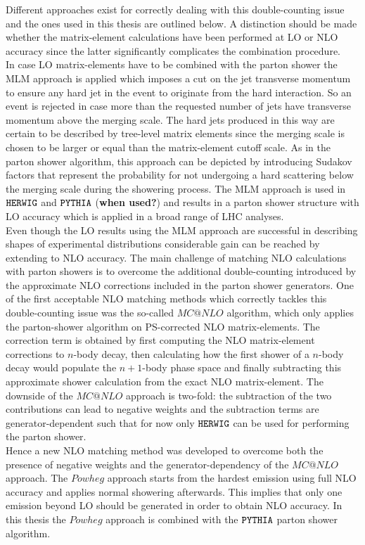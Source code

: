 Different approaches exist for correctly dealing with this double-counting issue and the ones used in this thesis are outlined below. A distinction should be made whether the matrix-element calculations have been performed at LO or NLO accuracy since the latter significantly complicates the combination procedure.\\
In case LO matrix-elements have to be combined with the parton shower the MLM approach is applied which imposes a cut on the jet transverse momentum to ensure any hard jet in the event to originate from the hard interaction. So an event is rejected in case more than the requested number of jets have transverse momentum above the merging scale. The hard jets produced in this way are certain to be described by tree-level matrix elements since the merging scale is chosen to be larger or equal than the matrix-element cutoff scale.
As in the parton shower algorithm, this approach can be depicted by introducing Sudakov factors that represent the probability for not undergoing a hard scattering below the merging scale during the showering process.
The MLM approach is used in $\texttt{HERWIG}$ and $\texttt{PYTHIA}$ (\textbf{when used?}) and results in a parton shower structure with LO accuracy which is applied in a broad range of LHC analyses.
\\
Even though the LO results using the MLM approach are successful in describing shapes of experimental distributions considerable gain can be reached by extending to NLO accuracy. 
The main challenge of matching NLO calculations with parton showers is to overcome the additional double-counting introduced by the approximate NLO corrections included in the parton shower generators. 
One of the first acceptable NLO matching methods which correctly tackles this double-counting issue was the so-called $MC@NLO$ algorithm, which only applies the parton-shower algorithm on PS-corrected NLO matrix-elements.
The correction term is obtained by first computing the NLO matrix-element corrections to $n$-body decay, then calculating how the first shower of a $n$-body decay would populate the $n+1$-body phase space and finally subtracting this approximate shower calculation from the exact NLO matrix-element. The downside of the $MC@NLO$ approach is two-fold: the subtraction of the two contributions can lead to negative weights and the subtraction terms are generator-dependent such that for now only $\texttt{HERWIG}$ can be used for performing the parton shower. 
\\
Hence a new NLO matching method was developed to overcome both the presence of negative weights and the generator-dependency of the $MC@NLO$ approach. The $Powheg$ approach starts from the hardest emission using full NLO accuracy and applies normal showering afterwards. This implies that only one emission beyond LO should be generated in order to obtain NLO accuracy. In this thesis the $Powheg$ approach is combined with the $\texttt{PYTHIA}$ parton shower algorithm.

